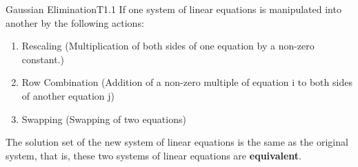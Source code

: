 \documentclass[oneside]{book}
\begin{document}
	\begin{theo}{Gaussian Elimination}{T1.1}
		If one system of linear equations is manipulated into another by the following actions:
		\begin{enumerate}
			\item Rescaling (Multiplication of both sides of one equation by a non-zero constant.)
			\item Row Combination (Addition of a non-zero multiple of equation i to both sides of another equation j)
			\item Swapping (Swapping of two equations)
		\end{enumerate}
		The solution set of the new system of linear equations is the same as the original system, that is, these two systems of linear equations are \textbf{equivalent}.
	\end{theo}
\end{document}
